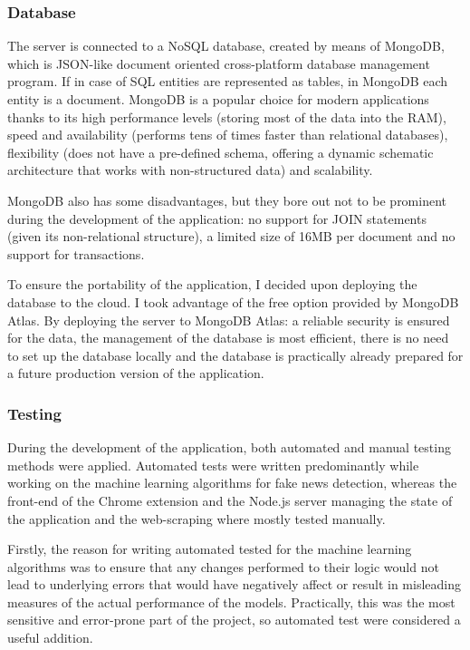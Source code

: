 \subsubsection{Database}
  The server is connected to a NoSQL database, created by means of MongoDB, which is JSON-like document oriented cross-platform database management program. If in case of SQL entities are represented as tables, in MongoDB each entity is a document. MongoDB is a popular choice for modern applications thanks to its high performance levels (storing most of the data into the RAM), speed and availability (performs tens of times faster than relational databases), flexibility (does not have a pre-defined schema, offering a dynamic schematic architecture that works with non-structured data) and scalability.
    
  MongoDB also has some disadvantages, but they bore out not to be prominent during the development of the application: no support for JOIN statements (given its non-relational structure), a limited size of 16MB per document and no support for transactions. 

  To ensure the portability of the application, I decided upon deploying the database to the cloud. I took advantage of the free option provided by MongoDB Atlas. By deploying the server to MongoDB Atlas: a reliable security is ensured for the data, the management of the database is most efficient, there is no need to set up the database locally and the database is practically already prepared for a future production version of the application.

\subsubsection{Testing}
  During the development of the application, both automated and manual testing methods were applied. Automated tests were written predominantly while working on the machine learning algorithms for fake news detection, whereas the front-end of the Chrome extension and the Node.js server managing the state of the application and the web-scraping where mostly tested manually.

  Firstly, the reason for writing automated tested for the machine learning algorithms was to ensure that any changes performed to their logic would not lead to underlying errors that would have negatively affect or result in misleading measures of the actual performance of the models. Practically, this was the most sensitive and error-prone part of the project, so automated test were considered a useful addition.

